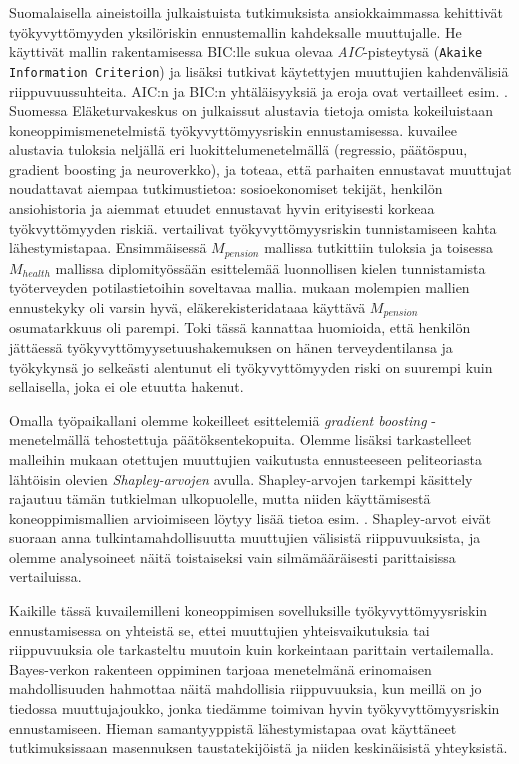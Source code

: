 Suomalaisella aineistoilla julkaistuista tutkimuksista ansiokkaimmassa \citet{airaksinen_development_2017} kehittivät työkyvyttömyyden yksilöriskin ennustemallin kahdeksalle muuttujalle. He käyttivät mallin rakentamisessa BIC:lle sukua olevaa \emph{AIC}-pisteytysä (\texttt{Akaike Information Criterion}) ja lisäksi tutkivat käytettyjen muuttujien kahdenvälisiä riippuvuussuhteita. AIC:n ja BIC:n yhtäläisyyksiä ja eroja ovat vertailleet esim. \citet{ding_model_2018}. Suomessa Eläketurvakeskus on julkaissut alustavia tietoja omista kokeiluistaan koneoppimismenetelmistä työkyvyttömyysriskin ennustamisessa. \citet{varis_aketurvakeskuksen_2018} kuvailee alustavia tuloksia neljällä eri luokittelumenetelmällä (regressio, päätöspuu, gradient boosting ja neuroverkko), ja toteaa, että parhaiten ennustavat muuttujat noudattavat aiempaa tutkimustietoa: sosioekonomiset tekijät, henkilön ansiohistoria ja aiemmat etuudet ennustavat hyvin erityisesti korkeaa työkvyttömyyden riskiä.  \citet{saarela_work_2022} vertailivat työkyvyttömyysriskin tunnistamiseen kahta lähestymistapaa. Ensimmäisessä $M_{pension}$ mallissa tutkittiin \citet{varis_aketurvakeskuksen_2018} tuloksia ja toisessa $M_{health}$ mallissa \citet{huhta-koivisto_work_2020} diplomityössään esittelemää luonnollisen kielen tunnistamista työterveyden potilastietoihin soveltavaa mallia. \citet{varis_aketurvakeskuksen_2018} mukaan molempien mallien ennustekyky oli varsin hyvä, eläkerekisteridataaa käyttävä $M_{pension}$ osumatarkkuus oli parempi. Toki tässä kannattaa huomioida, että henkilön jättäessä työkyvyttömyysetuushakemuksen on hänen terveydentilansa ja työkykynsä jo selkeästi alentunut eli työkyvyttömyyden riski on suurempi kuin sellaisella, joka ei ole etuutta hakenut.

Omalla työpaikallani olemme kokeilleet \citet{friedman_greedy_2001} esittelemiä \emph{gradient boosting} -menetelmällä tehostettuja päätöksentekopuita. Olemme lisäksi tarkastelleet malleihin mukaan otettujen muuttujien vaikutusta ennusteeseen peliteoriasta lähtöisin olevien \emph{Shapley-arvojen} avulla. Shapley-arvojen tarkempi käsittely rajautuu tämän tutkielman ulkopuolelle, mutta niiden käyttämisestä koneoppimismallien arvioimiseen löytyy lisää tietoa esim. \citet{merrick_explanation_2020}. Shapley-arvot eivät suoraan anna tulkintamahdollisuutta muuttujien välisistä riippuvuuksista, ja olemme analysoineet näitä toistaiseksi vain silmämääräisesti parittaisissa vertailuissa.

Kaikille tässä kuvailemilleni koneoppimisen sovelluksille työkyvyttömyysriskin ennustamisessa on yhteistä se, ettei muuttujien yhteisvaikutuksia tai riippuvuuksia ole tarkasteltu muutoin kuin korkeintaan parittain vertailemalla. Bayes-verkon rakenteen oppiminen tarjoaa menetelmänä erinomaisen mahdollisuuden hahmottaa näitä mahdollisia riippuvuuksia, kun meillä on jo tiedossa muuttujajoukko, jonka tiedämme toimivan hyvin työkyvyttömyysriskin ennustamiseen. Hieman samantyyppistä lähestymistapaa ovat käyttäneet \citet{elovainio_is_2021, elovainio_network_2020} tutkimuksissaan masennuksen taustatekijöistä ja niiden keskinäisistä yhteyksistä.

